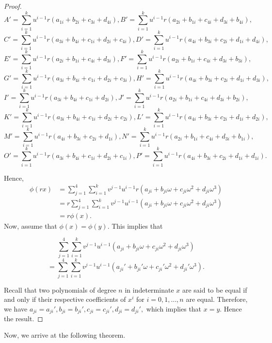 \documentclass{amsart}
\theoremstyle{definition}
\theoremstyle{remark}
\numberwithin{equation}{section}
\begin{document}
\begin{proof}
$$ A'=\sum_{i=1}^{k}u^{i-1}r(a_{1i}+b_{2i}+c_{3i}+d_{4i}), 
B'= \sum_{i=1}^{k}u^{i-1}r(a_{2i}+b_{1i}+c_{4i}+d_{3i}+b_{4i}),$$
$$ C'= \sum_{i=1}^{k}u^{i-1}r(a_{3i}+b_{4i}+c_{1i}+d_{2i}+c_{4i}), 
D'= \sum_{i=1}^{k}u^{i-1}r(a_{4i}+b_{3i}+c_{2i}+d_{1i}+d_{4i}),$$
$$ E'= \sum_{i=1}^{k}u^{i-1}r(a_{2i}+b_{1i}+c_{4i}+d_{3i}), 
F'= \sum_{i=1}^{k}u^{i-1}r(a_{2i}+b_{1i}+c_{4i}+d_{3i}+b_{3i}),$$
$$ G'= \sum_{i=1}^{k}u^{i-1}r(a_{3i}+b_{4i}+c_{1i}+d_{2i}+c_{3i}), 
H'= \sum_{i=1}^{k}u^{i-1}r(a_{4i}+b_{3i}+c_{2i}+d_{1i}+d_{3i}),$$
$$ I'= \sum_{i=1}^{k}u^{i-1}r(a_{3i}+b_{4i}+c_{1i}+d_{2i}), 
J'= \sum_{i=1}^{k}u^{i-1}r(a_{2i}+b_{1i}+c_{4i}+d_{3i}+b_{2i}),$$ 
$$ K'= \sum_{i=1}^{k}u^{i-1}r(a_{3i}+b_{4i}+c_{1i}+d_{2i}+c_{2i}), 
L'= \sum_{i=1}^{k}u^{i-1}r(a_{4i}+b_{3i}+c_{2i}+d_{1i}+d_{2i}),$$
$$ M'=\sum_{i=1}^{k}u^{i-1}r(a_{4i}+b_{3i}+c_{2i}+d_{1i}), 
N'= \sum_{i=1}^{k}u^{i-1}r(a_{2i}+b_{1i}+c_{4i}+d_{3i}+b_{1i}),$$
$$ O'= \sum_{i=1}^{k}u^{i-1}r(a_{3i}+b_{4i}+c_{1i}+d_{2i}+c_{1i}),
P'= \sum_{i=1}^{k}u^{i-1}r(a_{4i}+b_{3i}+c_{2i}+d_{1i}+d_{1i}).$$
    
 Hence, \begin{align*}
      \phi(rx)&= \sum_{j=1}^{4} \sum_{i=1}^{k} v^{j-1}u^{i-1}r(a_{ji}+b_{ji}\omega+c_{ji}\omega^2+d_{ji}\omega^3) \\&
      = r\sum_{j=1}^{4} \sum_{i=1}^{k} v^{j-1}u^{i-1}(a_{ji}+b_{ji}\omega+c_{ji}\omega^2+d_{ji}\omega^3) \\&
      =r\phi(x).
  \end{align*}
  Now, assume that $\phi(x)=\phi(y)$.
  This implies that
  
$$ \sum_{j=1}^{4} \sum_{i=1}^{k} v^{j-1}u^{i-1}(a_{ji}+b_{ji}\omega+c_{ji}\omega^2+d_{ji}\omega^3) $$ 
$$= \sum_{j=1}^{4} \sum_{i=1}^{k} v^{j-1}u^{i-1}(a_{ji}'+b_{ji}'\omega+c_{ji}'\omega^2+d_{ji}'\omega^3).$$
  
  Recall that two polynomials of degree $n$ in indeterminate $x$ are said to be equal
if and only if their respective coefficients of $x^i$ for $i = 0,1,\dots,n$ are equal. Therefore, we have
$a_{ji}=a_{ji}' , b_{ji}=b_{ji}' , c_{ji}=c_{ji}' , d_{ji}=d_{ji}',$
which implies that $x=y$. Hence the result.\end{proof}
Now, we arrive at the following theorem.
\end{document}
